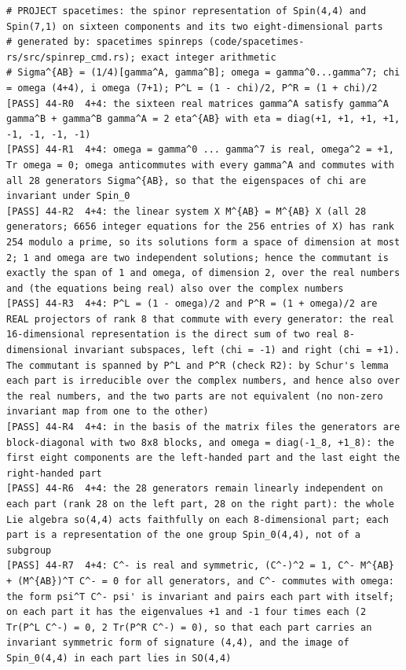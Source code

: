 \documentclass[
  10pt,
]{article}
\begin{document}
\begin{verbatim}
# PROJECT spacetimes: the spinor representation of Spin(4,4) and Spin(7,1) on sixteen components and its two eight-dimensional parts
# generated by: spacetimes spinreps (code/spacetimes-rs/src/spinrep_cmd.rs); exact integer arithmetic
# Sigma^{AB} = (1/4)[gamma^A, gamma^B]; omega = gamma^0...gamma^7; chi = omega (4+4), i omega (7+1); P^L = (1 - chi)/2, P^R = (1 + chi)/2
[PASS] 44-R0  4+4: the sixteen real matrices gamma^A satisfy gamma^A gamma^B + gamma^B gamma^A = 2 eta^{AB} with eta = diag(+1, +1, +1, +1, -1, -1, -1, -1)
[PASS] 44-R1  4+4: omega = gamma^0 ... gamma^7 is real, omega^2 = +1, Tr omega = 0; omega anticommutes with every gamma^A and commutes with all 28 generators Sigma^{AB}, so that the eigenspaces of chi are invariant under Spin_0
[PASS] 44-R2  4+4: the linear system X M^{AB} = M^{AB} X (all 28 generators; 6656 integer equations for the 256 entries of X) has rank 254 modulo a prime, so its solutions form a space of dimension at most 2; 1 and omega are two independent solutions; hence the commutant is exactly the span of 1 and omega, of dimension 2, over the real numbers and (the equations being real) also over the complex numbers
[PASS] 44-R3  4+4: P^L = (1 - omega)/2 and P^R = (1 + omega)/2 are REAL projectors of rank 8 that commute with every generator: the real 16-dimensional representation is the direct sum of two real 8-dimensional invariant subspaces, left (chi = -1) and right (chi = +1). The commutant is spanned by P^L and P^R (check R2): by Schur's lemma each part is irreducible over the complex numbers, and hence also over the real numbers, and the two parts are not equivalent (no non-zero invariant map from one to the other)
[PASS] 44-R4  4+4: in the basis of the matrix files the generators are block-diagonal with two 8x8 blocks, and omega = diag(-1_8, +1_8): the first eight components are the left-handed part and the last eight the right-handed part
[PASS] 44-R6  4+4: the 28 generators remain linearly independent on each part (rank 28 on the left part, 28 on the right part): the whole Lie algebra so(4,4) acts faithfully on each 8-dimensional part; each part is a representation of the one group Spin_0(4,4), not of a subgroup
[PASS] 44-R7  4+4: C^- is real and symmetric, (C^-)^2 = 1, C^- M^{AB} + (M^{AB})^T C^- = 0 for all generators, and C^- commutes with omega: the form psi^T C^- psi' is invariant and pairs each part with itself; on each part it has the eigenvalues +1 and -1 four times each (2 Tr(P^L C^-) = 0, 2 Tr(P^R C^-) = 0), so that each part carries an invariant symmetric form of signature (4,4), and the image of Spin_0(4,4) in each part lies in SO(4,4)

\end{verbatim}
\end{document}

